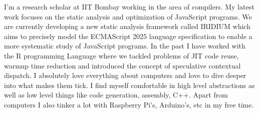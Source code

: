 \documentclass[10pt,a4paper,ragged2e]{altacv}
\begin{document}
\smallskip
{}

\begin{fullwidth}
\makecvheader
\end{fullwidth}



\begin{justifying}
  \noindent
  I'm a research scholar at IIT Bombay working in the area of compilers.
  My latest work focuses on the static analysis and optimization of JavaScript programs.
  We are currently developing a new static analysis framework called IRIDIUM which aims to precisely model the ECMAScript 2025 language specification to enable a more systematic study of JavaScript programs.
  In the past I have worked with the R programming Language where we tackled problems of JIT code reuse, warmup time reduction and introduced the concept of speculative contextual dispatch.
  I absolutely love everything about computers and love to dive deeper into what makes them tick.
  I find myself comfortable in high level abstractions as well as low level things like code generation, assembly, C++.
  Apart from computers I also tinker a lot with Raspberry Pi's, Arduino's, etc in my free time.

\end{justifying}





\end{document}
